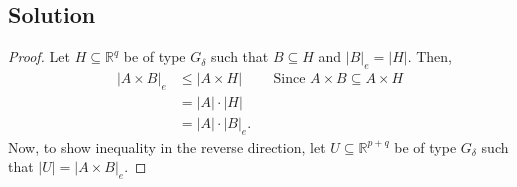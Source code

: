 \documentclass[10pt,a4paper]{article}
\theoremstyle{theorem}
\theoremstyle{definition}
\begin{document}
\subsection*{Solution}
\begin{proof}
Let $H \subseteq \mathbb{R}^q$ be of type $G_\delta$ such that $B \subseteq H$ and $|B|_e = |H|$. Then,
\begin{align*}
|A \times B|_e &\leq |A \times H| &&\text{Since } A \times B \subseteq A \times H\\
&= |A| \cdot |H|\\
&= |A| \cdot |B|_e.
\end{align*}
Now, to show inequality in the reverse direction, let $U \subseteq \mathbb{R}^{p + q}$ be of type $G_\delta$ such that $|U| = |A \times B|_e$.
\end{proof}
\end{document}

